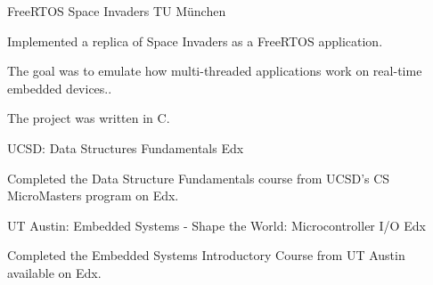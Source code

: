 
\begin{cventries}
  \cventry
    {} %
    {FreeRTOS Space Invaders} %
    {TU München} %
    {} %
    {
      \begin{cvitems} %
        \item {Implemented a replica of Space Invaders as a 
               FreeRTOS application.  }
        \item {The goal was to emulate how
               multi-threaded applications work on
               real-time embedded devices..}
        \item {The project was written in C.}
      \end{cvitems}
    }

  \cventry
    {} %
    {UCSD: Data Structures Fundamentals} %
    {Edx} %
    {} %
    {
      \begin{cvitems} %
      	\item {Completed the Data Structure Fundamentals course from UCSD's CS MicroMasters program on Edx.}
      \end{cvitems}
    }

  \cventry
    {} %
    {UT Austin: Embedded Systems - Shape the World: Microcontroller I/O} %
    {Edx} %
    {} %
    {
      \begin{cvitems} %
      	\item {Completed the Embedded Systems Introductory Course from UT Austin available on Edx.}
      \end{cvitems}
    }
\end{cventries}
